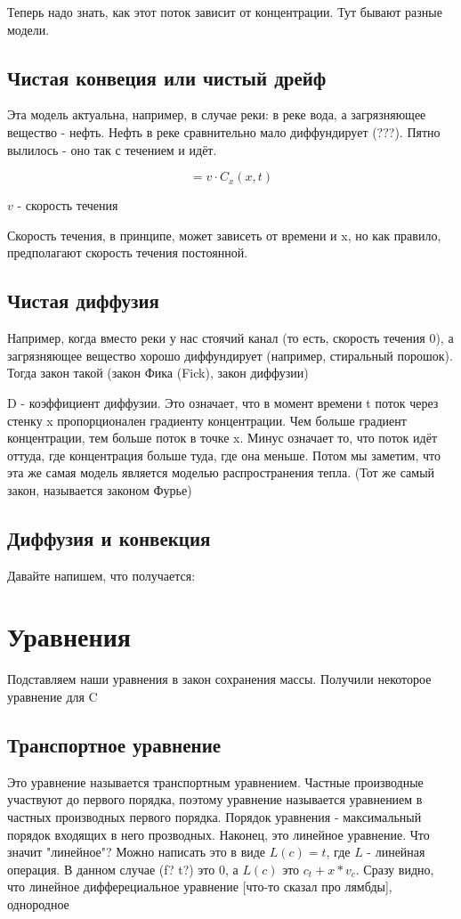 Теперь надо знать, как этот поток зависит от концентрации. Тут бывают разные модели.
\subsection*{Чистая конвеция или чистый дрейф}
Эта модель актуальна, например, в случае реки: в реке вода, а загрязняющее вещество - нефть. Нефть в реке сравнительно мало диффундирует (???). Пятно вылилось - оно так с течением и идёт.

$$  = v \cdot C_x(x,t)$$

$v$ - скорость течения

Скорость течения, в принципе, может зависеть от времени и x, но как правило, предполагают скорость течения постоянной.

\subsection*{Чистая диффузия}

Например, когда вместо реки у нас стоячий канал (то есть, скорость течения 0), а загрязняющее вещество хорошо диффундирует (например, стиральный порошок). Тогда закон такой (закон Фика (Fick), закон диффузии)


D - коэффициент диффузии.
Это означает, что в момент времени t поток через стенку x пропорционален градиенту концентрации. Чем больше градиент концентрации, тем больше поток в точке x. Минус означает то, что поток идёт оттуда, где концентрация больше туда, где она меньше. Потом мы заметим, что эта же самая модель является моделью распространения тепла. (Тот же самый закон, называется законом Фурье)

\subsection*{Диффузия и конвекция}


Давайте напишем, что получается:

\section{Уравнения}
Подставляем наши уравнения в закон сохранения массы. Получили некоторое уравнение для C

\subsection*{Транспортное уравнение}
Это уравнение называется транспортным уравнением. Частные производные участвуют до первого порядка, поэтому уравнение называется уравнением в частных производных первого порядка. Порядок уравнения - максимальный порядок входящих в него прозводных. Наконец, это линейное уравнение.
Что значит "линейное"? Можно написать это в виде $L(c) = t$, где $L$ - линейная операция. В данном случае (f? t?) это 0, а $L(c)$ это $c_t + x*v_c$. Сразу видно, что линейное дифферециальное уравнение [что-то сказал про лямбды], однородное

